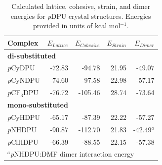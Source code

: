 \begin{table}[]
\centering
\caption{Calculated lattice, cohesive, strain, and dimer energies for \textit{p}DPU crystal structures. Energies provided in units of kcal mol$^{-1}$.} \label{tab:dpu-energies}
\begin{tabular}{lrrrr}
\textbf{Complex} & $E_{Lattice}$ & $E_{Cohesive}$ & $E_{Strain}$ & $E_{Dimer}$ \\ \hline
\multicolumn{2}{l}{\textbf{di-substituted}} &  &  &  \\
\textit{p}CyDPU & -72.83 & -94.78 & 21.95 & -49.07 \\
\textit{p}CyNDPU & -74.60 & -97.58 & 22.98 & -57.17 \\
\textit{p}CF$_{3}$DPU & -76.72 & -105.46 & 28.74 & -73.64 \\
\multicolumn{2}{l}{\textbf{mono-substituted}} &  &  &  \\
\textit{p}CyHDPU & -65.17 & -87.39 & 22.22 & -57.27 \\
\textit{p}NHDPU & -90.87 & -112.70 & 21.83 & -42.49$^{a}$ \\
\textit{p}ClHDPU & -66.39 & -88.55 & 22.15 & -57.38 \\ \hline
\multicolumn{5}{l}{$^{a}$\textit{p}NHDPU:DMF dimer interaction energy}
\end{tabular}
\end{table}


